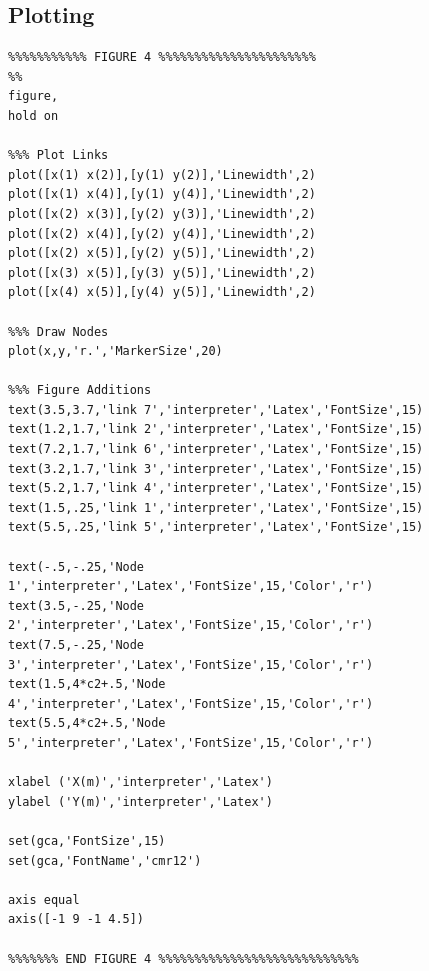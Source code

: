 \documentclass[12pt]{article}
\begin{document}
\subsection{Plotting}
\begin{verbatim}
%%%%%%%%%%% FIGURE 4 %%%%%%%%%%%%%%%%%%%%%%
%%
figure,
hold on

%%% Plot Links
plot([x(1) x(2)],[y(1) y(2)],'Linewidth',2)
plot([x(1) x(4)],[y(1) y(4)],'Linewidth',2)
plot([x(2) x(3)],[y(2) y(3)],'Linewidth',2)
plot([x(2) x(4)],[y(2) y(4)],'Linewidth',2)
plot([x(2) x(5)],[y(2) y(5)],'Linewidth',2)
plot([x(3) x(5)],[y(3) y(5)],'Linewidth',2)
plot([x(4) x(5)],[y(4) y(5)],'Linewidth',2)

%%% Draw Nodes
plot(x,y,'r.','MarkerSize',20)

%%% Figure Additions
text(3.5,3.7,'link 7','interpreter','Latex','FontSize',15)
text(1.2,1.7,'link 2','interpreter','Latex','FontSize',15)
text(7.2,1.7,'link 6','interpreter','Latex','FontSize',15)
text(3.2,1.7,'link 3','interpreter','Latex','FontSize',15)
text(5.2,1.7,'link 4','interpreter','Latex','FontSize',15)
text(1.5,.25,'link 1','interpreter','Latex','FontSize',15)
text(5.5,.25,'link 5','interpreter','Latex','FontSize',15)

text(-.5,-.25,'Node 1','interpreter','Latex','FontSize',15,'Color','r')
text(3.5,-.25,'Node 2','interpreter','Latex','FontSize',15,'Color','r')
text(7.5,-.25,'Node 3','interpreter','Latex','FontSize',15,'Color','r')
text(1.5,4*c2+.5,'Node 4','interpreter','Latex','FontSize',15,'Color','r')
text(5.5,4*c2+.5,'Node 5','interpreter','Latex','FontSize',15,'Color','r')

xlabel ('X(m)','interpreter','Latex')
ylabel ('Y(m)','interpreter','Latex')

set(gca,'FontSize',15)
set(gca,'FontName','cmr12')

axis equal
axis([-1 9 -1 4.5])

%%%%%%% END FIGURE 4 %%%%%%%%%%%%%%%%%%%%%%%%%%%%
\end{verbatim}



\end{document}
